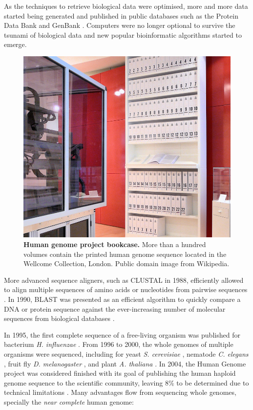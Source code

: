 As the techniques to retrieve biological data were optimised, more and more data started being generated and published in public databases such as the Protein Data Bank \cite{protein-data-bank:1971tm} and GenBank \cite{burks:1985ts}. Computers were no longer optional to survive the tsunami of biological data and new popular bioinformatic algorithms started to emerge.
\begin{figure}
  \includegraphics[width=\linewidth]{images/intro/human-genome-project-bookcase}
  \caption[Human genome project bookcase]{\textbf{Human genome project bookcase.} More than a hundred volumes contain the printed human genome sequence located in the Wellcome Collection, London. Public domain image from Wikipedia.}
  \label{fig:dna-sequencer}
\end{figure}
More advanced sequence aligners, such as CLUSTAL in 1988, efficiently allowed to align multiple sequences of amino acids or nucleotides from pairwise sequences \cite{higgins:1988ul}. In 1990, BLAST was presented as an efficient algorithm to quickly compare a DNA or protein sequence against the ever-increasing number of molecular sequences from biological databases \cite{altschul:1990vt}.

In 1995, the first complete sequence of a free-living organism was published for bacterium \emph{H. influenzae} \cite{fleischmann:1995vz}. From 1996 to 2000, the whole genomes of multiple organisms were sequenced, including for yeast \emph{S. cerevisiae} \cite{goffeau:1996tk}, nematode \emph{C. elegans} \cite{the-c.-elegans-sequencing-consortium:1998wf}, fruit fly \emph{D. melanogaster} \cite{myers:2000wk,adams:2000tj}, and plant \emph{A. thaliana} \cite{the-arabidopsis-genome-initiative:2000tm}. In 2004, the Human Genome project was considered finished with its goal of publishing the human haploid genome sequence to the scientific community, leaving 8\% to be determined due to technical limitations \cite{consortium:2004wi,nurk:2021up}. Many advantages flow from sequencing whole genomes, specially the \emph{near complete} human genome:

